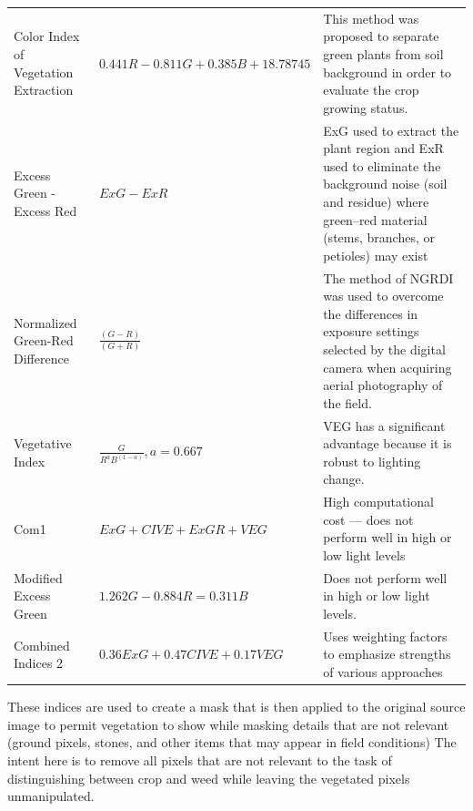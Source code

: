 \documentclass[letterpaper]{article}
\begin{document}
{{{\begin{longtable}{x{\dimexpr.25\tabcolsep}
                  x{\dimexpr.35\tabcolsep}
                  x{\dimexpr.4\tabcolsep}}
		Color Index of Vegetation Extraction      
		& $0.441 R - 0.811 G + 0.385 B + 18.78745$
		& This method was proposed to separate green plants from soil background in order to evaluate the crop growing status.
\tabularnewline\addlinespace

		Excess Green - Excess Red   
		& $ExG - ExR$ 
		& ExG used to extract the plant region and ExR used to eliminate the background noise (soil and residue) where green–red material (stems, branches, or petioles) may exist
\tabularnewline\addlinespace

		Normalized Green-Red Difference    
		& $\frac {(G - R)} {(G + R)}$ 
		& The method of NGRDI was used to overcome the differences in exposure settings selected by the digital camera when acquiring aerial photography of the field. 
\tabularnewline\addlinespace

		Vegetative Index      
		& $\frac {G} {R^aB^{(1-a)}}, a = 0.667$ 
		& VEG has a significant advantage because it is robust to lighting change.
\tabularnewline\addlinespace

		Com1   
		& $ExG + CIVE + ExGR + VEG$ 
		& High computational cost --- does not perform well in high or low light levels
\tabularnewline\addlinespace

		Modified Excess Green      
		& $1.262G - 0.884R = 0.311B$ 
		& Does not perform well in high or low light levels. 
\tabularnewline\addlinespace

		Combined Indices 2      
		& $0.36ExG + 0.47CIVE + 0.17VEG$ 
		& Uses weighting factors to emphasize strengths of various approaches
\label{table:indices}
\end{longtable}
}

These indices are used to create a mask that is then applied to the original source image to permit vegetation to show while masking details that are not relevant (ground pixels, stones, and other items that may appear in field conditions) The intent here is to remove all pixels that are not relevant to the task of distinguishing between crop and weed while leaving the vegetated pixels unmanipulated.

}}
\end{document}
